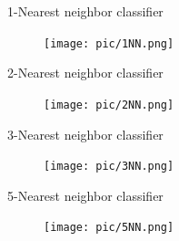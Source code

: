\documentclass[serif, aspectratio=169]{beamer}
\begin{document}
\begin{frame}{1-Nearest neighbor classifier}
    \begin{figure}[h]
            \centering
            
            \texttt{[image: pic/1NN.png]}
            \end{figure}
\end{frame}
\begin{frame}{2-Nearest neighbor classifier}
    \begin{figure}[h]
            \centering
            
            \texttt{[image: pic/2NN.png]}
            \end{figure}
\end{frame}
\begin{frame}{3-Nearest neighbor classifier}
    \begin{figure}[h]
            \centering
            
            \texttt{[image: pic/3NN.png]}
            \end{figure}
\end{frame}
\begin{frame}{5-Nearest neighbor classifier}
    \begin{figure}[h]
            \centering
            
            \texttt{[image: pic/5NN.png]}
            \end{figure}
    \vfill
\end{frame}
\end{document}
